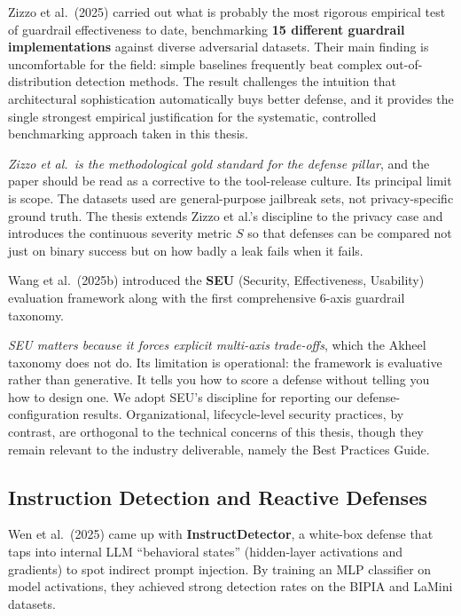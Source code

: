 \documentclass[12pt,a4paper]{report}
\begin{document}
Zizzo et al.\ (2025) carried out what is probably the most rigorous empirical test of guardrail effectiveness to date, benchmarking \textbf{15 different guardrail implementations} against diverse adversarial datasets. Their main finding is uncomfortable for the field: simple baselines frequently beat complex out-of-distribution detection methods. The result challenges the intuition that architectural sophistication automatically buys better defense, and it provides the single strongest empirical justification for the systematic, controlled benchmarking approach taken in this thesis.

\begin{critbox}
\textit{Zizzo et al.\ is the methodological gold standard for the defense pillar}, and the paper should be read as a corrective to the tool-release culture. Its principal limit is scope. The datasets used are general-purpose jailbreak sets, not privacy-specific ground truth. The thesis extends Zizzo et al.'s discipline to the privacy case and introduces the continuous severity metric $S$ so that defenses can be compared not just on binary success but on how badly a leak fails when it fails.
\end{critbox}

Wang et al.\ (2025b) introduced the \textbf{SEU} (Security, Effectiveness, Usability) evaluation framework along with the first comprehensive 6-axis guardrail taxonomy.

\begin{critbox}
\textit{SEU matters because it forces explicit multi-axis trade-offs}, which the Akheel taxonomy does not do. Its limitation is operational: the framework is evaluative rather than generative. It tells you how to score a defense without telling you how to design one. We adopt SEU's discipline for reporting our defense-configuration results. Organizational, lifecycle-level security practices, by contrast, are orthogonal to the technical concerns of this thesis, though they remain relevant to the industry deliverable, namely the Best Practices Guide.
\end{critbox}

\subsection{Instruction Detection and Reactive Defenses}

Wen et al.\ (2025) came up with \textbf{InstructDetector}, a white-box defense that taps into internal LLM ``behavioral states'' (hidden-layer activations and gradients) to spot indirect prompt injection. By training an MLP classifier on model activations, they achieved strong detection rates on the BIPIA and LaMini datasets.
\end{document}
